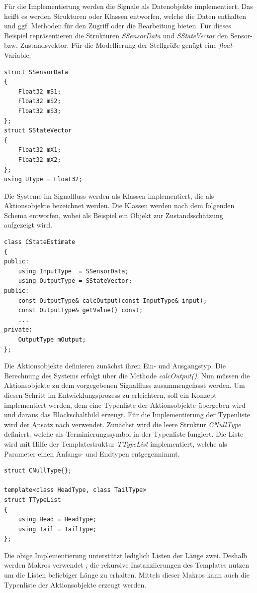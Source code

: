 Für die Implementierung werden die Signale als Datenobjekte implementiert. Das heißt es werden Strukturen oder Klassen entworfen, welche die Daten enthalten und ggf. Methoden für den Zugriff oder die Bearbeitung bieten. Für dieses Beispiel repräsentieren die Strukturen \textit{SSensorData} und \textit{SStateVector} den Sensor- bzw. Zustandsvektor. Für die Modellierung der Stellgröße genügt eine \textit{float}-Variable.
\begin{lstlisting}[caption={Beispielhafte Implementierung eines Datenobjektes},captionpos=b]
struct SSensorData
{
	Float32 mS1;
	Float32 mS2;
	Float32 mS3;
};
struct SStateVector
{
	Float32 mX1;
	Float32 mX2;
};
using UType = Float32;
\end{lstlisting}
Die Systeme im Signalfluss werden als Klassen implementiert, die als Aktionsobjekte bezeichnet werden. Die Klassen werden nach dem folgenden Schema entworfen, wobei als Beispiel ein Objekt zur Zustandsschätzung aufgezeigt wird.
\begin{lstlisting}[caption={Beispielhafte Implementierung eines Aktionsobjektes},captionpos=b]
class CStateEstimate
{
public:
	using InputType	 = SSensorData;
	using OutputType = SStateVector;
public:
	const OutputType& calcOutput(const InputType& input);
	const OutputType& getValue() const;
	...
private:	 
	OutputType mOutput;
};
\end{lstlisting}
Die Aktionsobjekte definieren zunächst ihren Ein- und Ausgangstyp. Die Berechnung des Systems erfolgt über die Methode \textit{calcOutput()}.
Nun müssen die Aktionsobjekte zu dem vorgegebenen Signalfluss zusammengefasst werden. Um diesen Schritt im Entwicklungsprozess zu erleichtern, soll ein Konzept implementiert werden, dem eine Typenliste der Aktionsobjekte übergeben wird und daraus das Blockschaltbild erzeugt.
Für die Implementierung der Typenliste wird der Ansatz nach \cite[S. 40 ff.]{ModernCpp} verwendet. Zunächst wird die leere Struktur \textit{CNullType} definiert, welche als Terminierungssymbol in der Typenliste fungiert. Die Liste wird mit Hilfe der Templatestruktur \textit{TTypeList} implementiert, welche als Parameter einen Anfangs- und Endtypen entgegennimmt.
\begin{lstlisting}[caption={Implementierung der Typenliste},captionpos=b]
struct CNullType{};

template<class HeadType, class TailType>
struct TTypeList
{
	using Head = HeadType;
	using Tail = TailType;
};
\end{lstlisting}
Die obige Implementierung unterstützt lediglich Listen der Länge zwei. Deshalb werden Makros verwendet \cite[S. 45]{ModernCpp}, die rekursive Instanziierungen des Templates nutzen um die Listen beliebiger Länge zu erhalten. Mittels dieser Makros kann auch die Typenliste der Aktionsobjekte erzeugt werden.
